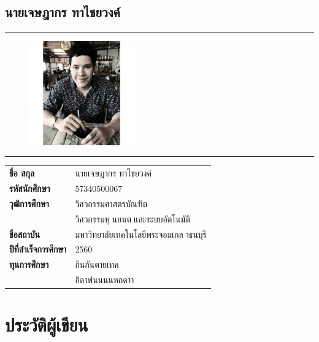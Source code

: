 \section*{นายเจษฎากร ทาไชยวงค์}
\hrule height .7pt
\begin{figure}[!ht]
	\centering
	\includegraphics[width=0.4\textwidth]{pages/images/taa.jpg}
\end{figure}
\hrule height .7pt
\raggedright
\begin{tabular}{p{} p{}}
    \textbf{ชื่อ สกุล} & {นายเจษฎากร ทาไชยวงค์} \\
    \textbf{รหัสนักศึกษา} & {57340500067}\\
    \textbf{วุฒิการศึกษา} & {วิศวกรรมศาสตรบัณฑิต} \\
    {} & {วิศวกรรมหุนยนตและระบบอัตโนมัติ}\\
    \textbf{ชื่อสถาบัน} & {มหาวิทยาลัยเทคโนโลยีพระจอมเกลาธนบุรี} \\
    \textbf{ปีที่สำเร็จการศึกษา} & {2560} \\
    \textbf{ทุนการศึกษา} & {กินกันตายเทค}\\
    {} & {กิดาฟนนนนหกดาา}\\
\end{tabular}   

\chapter*{ประวัติผู้เขียน}
